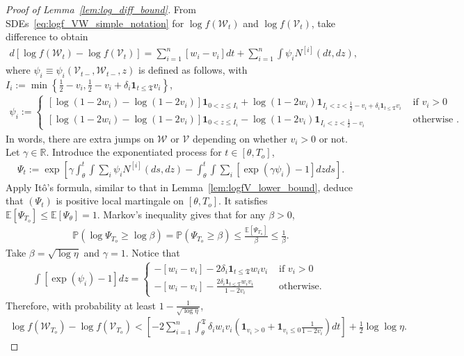 \documentclass[11pt]{article}
\newcommand{\stopT}{{\boldsymbol{\mathfrak{T}}}}
\newcommand{\To}{{T_o}}
\newcommand{\rV}{\mathscr{V}}
\newcommand{\rW}{\mathscr{W}}
\newcommand{\Ni}{N^{[i]}}
\theoremstyle{named}
\theoremstyle{plain}
\newcommand{\defn}{:=}
\newcommand{\real}{\ensuremath{\mathbb{R}}}
\newcommand{\Exs}{\ensuremath{{\mathbb{E}}}}
\newcommand{\Prob}{\ensuremath{{\mathbb{P}}}}
\newcommand{\brackets}[1]{\left[ #1 \right]}
\newcommand{\parenth}[1]{\left( #1 \right)}
\newcommand{\braces}[1]{\left\{ #1 \right \}}
\begin{document}
\begin{proof}[Proof of Lemma~\ref{lem:log_diff_bound}\label{proof_lem:log_diff_bound}]
  From SDEs~\eqref{eq:logf_VW_simple_notation} for $\log f(\rW_t)$ and $\log f(\rV_t)$, take difference to obtain
  \begin{align*}
    d [\log f(\rW_t) - \log f(\rV_t)]  = \sum_{i=1}^n [w_i - v_i] dt + \sum_{i=1}^n \int \psi_i \Ni(dt, dz),
  \end{align*}
  where $\psi_i \equiv \psi_i(\rV_{t-}, \rW_{t-}, z)$ is defined as follows, with $I_i \defn \min\braces{\frac12 - v_i, \frac12 - v_i + \delta_i \mathbf{1}_{t \leq \stopT} v_i}$, 
  \begin{align*}
    \psi_i \defn \begin{cases}
      [\log (1-2w_i) - \log(1-2v_i)] \mathbf{1}_{0 < z \leq I_i} + \log(1-2w_i) \mathbf{1}_{I_i < z < \frac12 - v_i + \delta_i \mathbf{1}_{t \leq \stopT} v_i} & \text{ if } v_i > 0 \\
      [\log (1-2w_i) - \log(1-2v_i)] \mathbf{1}_{0 < z \leq I_i} - \log(1-2v_i) \mathbf{1}_{I_i < z < \frac12 - v_i} & \text{ otherwise }.
    \end{cases}
  \end{align*}
  In words, there are extra jumps on $\rW$ or $\rV$ depending on whether $v_i > 0$ or not.  
  Let $\gamma \in \real$. Introduce the exponentiated process for $t \in [\theta, \To]$,
  \begin{align}
    \label{eq:exponentiated_process_lem11}
    \Psi_t \defn \exp\brackets{\gamma \int_\theta^t \int \sum_i \psi_i \Ni(ds, dz) - \int_\theta^t \int \sum_i \brackets{\exp(\gamma \psi_i) - 1} dz ds }.
  \end{align}
  Apply It\^o's formula, similar to that in Lemma~\ref{lem:logfV_lower_bound}, deduce that $(\Psi_t)$ is positive local martingale on $[\theta, \To]$. It satisfies $\Exs[\Psi_{\To}] \leq \Exs[\Psi_\theta] = 1$. Markov's inequality gives that for any $\beta > 0$,
  \begin{align*}
    \Prob(\log \Psi_\To \geq \log \beta) = \Prob(\Psi_\To \geq \beta) \leq \frac{\Exs[\Psi_\To]}{\beta} \leq \frac{1}{\beta}.
  \end{align*}
  Take $\beta = \sqrt{\log \eta}$ and $\gamma = 1$. Notice that
  \begin{align*}
    \int [\exp(\psi_i) - 1 ] dz = \begin{cases}
      \displaystyle -[w_i - v_i] - 2 \delta_i \mathbf{1}_{t \leq \stopT} w_i v_i & \text{ if } v_i > 0 \\
      \displaystyle -[w_i - v_i] - \frac{2 \delta_i \mathbf{1}_{t \leq \stopT} w_i v_i}{1-2v_i} & \text{ otherwise. } 
    \end{cases}
  \end{align*}
  Therefore, with probability at least $1 - \frac{1}{\sqrt{\log \eta}}$,
  \begin{align*}
    \log f(\rW_\To) - \log f(\rV_\To) < \brackets{- 2 \sum_{i=1}^n \int_\theta^{\stopT} \delta_i w_i v_i \parenth{\mathbf{1}_{v_i > 0} + \mathbf{1}_{v_i \leq 0} \frac{1}{1-2v_i} } dt } + \frac12 \log\log\eta. 
  \end{align*}

\end{proof}
\end{document}
